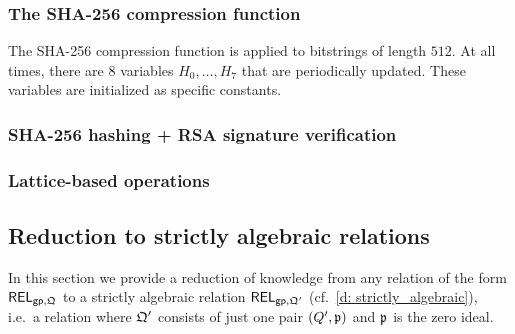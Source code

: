 \documentclass[11pt,letterpaper,usenames,dvipsnames]{article}
\begin{document}
\subsubsection{The SHA-256 compression function}

The SHA-256 compression function is applied to bitstrings of length $512$. At all times, there are $8$ variables $H_0,\ldots, H_7$ that are periodically updated.  These variables are initialized as specific constants.




\subsubsection{SHA-256 hashing + RSA signature verification}

\subsubsection{Lattice-based operations}


\subsection{Reduction to strictly algebraic relations}
\label{sec:reduction-to-algebraic-relations}

In this section we provide a reduction of knowledge from  any relation of the form $\mathsf{REL}_{\mathsf{gp}, \mathfrak{Q}}$ to a strictly algebraic relation $\mathsf{REL}_{\mathsf{gp}, \mathfrak{Q}'}$ (cf.\ \cref{d: strictly_algebraic}), i.e.\ a relation where  $\mathfrak{Q}'$ consists of just one pair $(Q', \mathfrak{p})$ and $\mathfrak{p}$ is the zero  ideal. 
\end{document}
